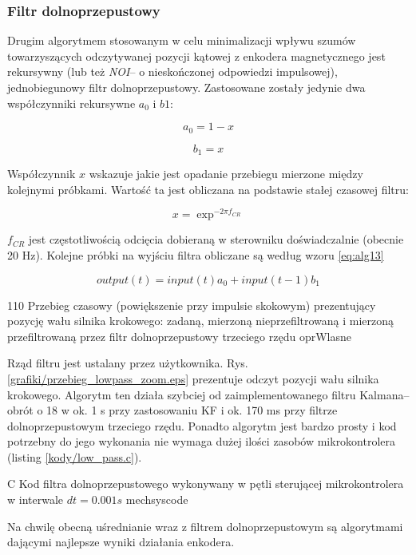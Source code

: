\clearpage

\subsubsection{Filtr dolnoprzepustowy}

Drugim algorytmem stosowanym w celu minimalizacji wpływu szumów towarzyszących odczytywanej pozycji kątowej z enkodera magnetycznego jest rekursywny (lub też {\it NOI}-- o nieskończonej odpowiedzi impulsowej), jednobiegunowy filtr dolnoprzepustowy. Zastosowane zostały jedynie dwa współczynniki rekursywne $ a_0 $ i $ b1 $:

\begin{equation} \label{eq:alg10}
	a_0 = 1 - x
\end{equation}

\begin{equation} \label{eq:alg11}
	b_1 = x
\end{equation}

Współczynnik $ x $ wskazuje jakie jest opadanie przebiegu mierzone między kolejnymi próbkami. Wartość ta jest obliczana na podstawie stałej czasowej filtru:

\begin{equation} \label{eq:alg12}
	x = \exp^{-2 \pi f_{CR}}
\end{equation}

$ f_{CR} $ jest częstotliwością odcięcia dobieraną w sterowniku doświadczalnie (obecnie 20 Hz). Kolejne próbki na wyjściu filtra obliczane są według wzoru \ref{eq:alg13}

\begin{equation} \label{eq:alg13}
	output(t) = input(t) a_0 + input(t - 1) b_1 
\end{equation}

	{110}
	{Przebieg czasowy (powiększenie przy impulsie skokowym) prezentujący pozycję wału silnika krokowego: zadaną,   mierzoną nieprzefiltrowaną i mierzoną przefiltrowaną przez filtr dolnoprzepustowy trzeciego rzędu}
	{oprWlasne}
	
Rząd filtru jest ustalany przez użytkownika. Rys. \ref{grafiki/przebieg_lowpass_zoom.eps} prezentuje odczyt pozycji wału silnika krokowego. Algorytm ten działa szybciej od zaimplementowanego filtru Kalmana-- obrót o 18\degree{} w ok. 1 s przy zastosowaniu KF i ok. 170 ms przy filtrze dolnoprzepustowym trzeciego rzędu. Ponadto algorytm jest bardzo prosty i kod potrzebny do jego wykonania nie wymaga dużej ilości zasobów mikrokontrolera (listing \ref{kody/low_pass.c}).

	{C}
	{Kod filtra dolnoprzepustowego wykonywany w pętli sterującej mikrokontrolera w interwale $ dt = 0.001 s $}
	{mechsyscode}
		   
Na chwilę obecną uśrednianie wraz z  filtrem dolnoprzepustowym są algorytmami dającymi najlepsze wyniki działania enkodera.















